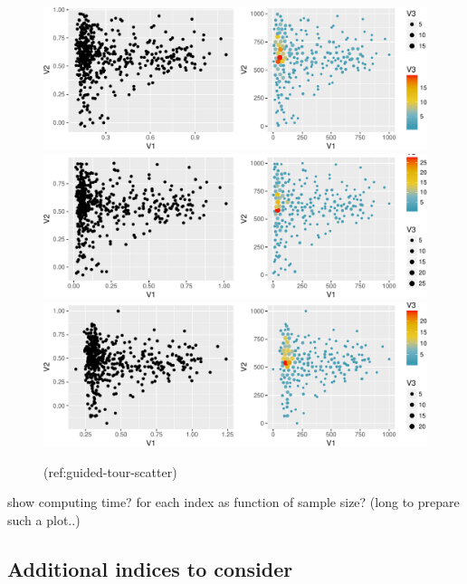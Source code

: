 \documentclass[article]{jss}
\begin{document}
\begin{CodeChunk}
\begin{figure}

{\centering \includegraphics[width=\textwidth]{figure/guided-tour-scatter-1} \includegraphics[width=\textwidth]{figure/guided-tour-scatter-2} \includegraphics[width=\textwidth]{figure/guided-tour-scatter-3} 

}

\caption[(ref:guided-tour-scatter)]{(ref:guided-tour-scatter)}\label{fig:guided-tour-scatter}
\end{figure}
\end{CodeChunk}

show computing time? for each index as function of sample size? (long to
prepare such a plot..)

\subsection{Additional indices to
consider}\label{additional-indices-to-consider}
\end{document}
